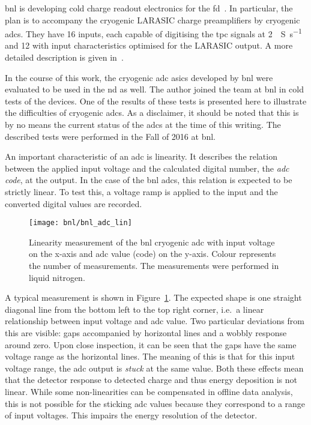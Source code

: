 \gls{bnl} is developing cold charge readout electronics for the \dune{} \gls{fd}~\cite{protodune-sp}.
In particular, the plan is to accompany the cryogenic LARASIC charge preamplifiers by cryogenic \glspl{adc}.
They have \num{16} inputs, each capable of digitising the \gls{tpc} signals at \SI{2}{\mega{}S\per\second} and \SI{12}{\bit} with input characteristics optimised for the LARASIC output.
A more detailed description is given in~\cite{bnl_adc}.

In the course of this work, the cryogenic \gls{adc} \glspl{asic} developed by \gls{bnl} were evaluated to be used in the \gls{nd} as well.
The author joined the team at \gls{bnl} in cold tests of the devices.
One of the results of these tests is presented here to illustrate the difficulties of cryogenic \glspl{adc}.
As a disclaimer, it should be noted that this is by no means the current status of the \glspl{adc} at the time of this writing.
The described tests were performed in the Fall of 2016 at \gls{bnl}.

An important characteristic of an \gls{adc} is linearity.
It describes the relation between the applied input voltage and the calculated digital number, the \emph{\gls{adc} code}, at the output.
In the case of the \gls{bnl} \glspl{adc}, this relation is expected to be strictly linear.
To test this, a voltage ramp is applied to the input and the converted digital values are recorded.

\begin{figure}[htb]
	\centering
	\texttt{[image: bnl/bnl\_adc\_lin]}
	\caption[Linearity measurement of  cryogenic  ]{%
		Linearity measurement of the \acrshort{bnl} cryogenic \acrshort{adc}  with input voltage on the x-axis and \acrshort{adc} value (code) on the y-axis.
		Colour represents the number of measurements.
		The measurements were performed in liquid nitrogen.
	}
	\label{fig:bnl_adc_lin}
\end{figure}

A typical measurement is shown in Figure~\ref{fig:bnl_adc_lin}.
The expected shape is one straight diagonal line from the bottom left to the top right corner, i.e.\ a linear relationship between input voltage and \gls{adc} value.
Two particular deviations from this are visible: gaps accompanied by horizontal lines and a wobbly response around zero.
Upon close inspection, it can be seen that the gaps have the same voltage range as the horizontal lines.
The meaning of this is that for this input voltage range, the \gls{adc} output is \emph{stuck} at the same value.
Both these effects mean that the detector response to detected charge and thus energy deposition is not linear.
While some non-linearities can be compensated in offline data analysis, this is not possible for the sticking \gls{adc} values because they correspond to a range of input voltages.
This impairs the energy resolution of the detector.


